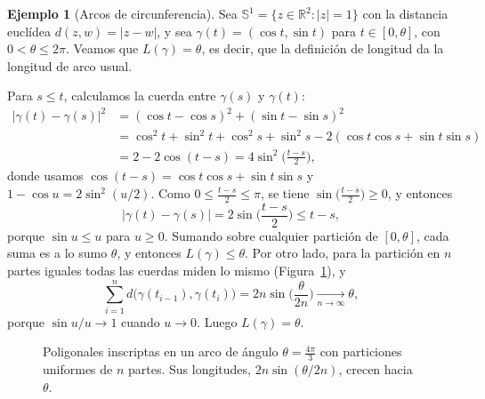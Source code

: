 \documentclass[12pt, a4paper]{amsart}
\theoremstyle{definition}
\newtheorem{ejemplo}[teorema]{Ejemplo}
\theoremstyle{remark}
\begin{document}
\begin{ejemplo}[Arcos de circunferencia]\label{ej:arco}
Sea $\mathbb S^1=\{z\in\mathbb R^2:|z|=1\}$ con la distancia euclídea $d(z,w)=|z-w|$, y sea $\gamma(t)=(\cos t,\sin t)$ para $t\in[0,\theta]$, con $0<\theta\le2\pi$. Veamos que $L(\gamma)=\theta$, es decir, que la definición de longitud da la longitud de arco usual.

Para $s\le t$, calculamos la cuerda entre $\gamma(s)$ y $\gamma(t)$:
\begin{align*}
|\gamma(t)-\gamma(s)|^2
&=(\cos t-\cos s)^2+(\sin t-\sin s)^2\\
&=\cos^2t+\sin^2t+\cos^2s+\sin^2s-2(\cos t\cos s+\sin t\sin s)\\
&=2-2\cos(t-s)=4\sin^2\Big(\frac{t-s}{2}\Big),
\end{align*}
donde usamos $\cos(t-s)=\cos t\cos s+\sin t\sin s$ y $1-\cos u=2\sin^2(u/2)$. Como $0\le\frac{t-s}{2}\le\pi$, se tiene $\sin\big(\frac{t-s}{2}\big)\ge0$, y entonces
\[
|\gamma(t)-\gamma(s)|=2\sin\Big(\frac{t-s}{2}\Big)\le t-s,
\]
porque $\sin u\le u$ para $u\ge0$. Sumando sobre cualquier partición de $[0,\theta]$, cada suma es a lo sumo $\theta$, y entonces $L(\gamma)\le\theta$. Por otro lado, para la partición en $n$ partes iguales todas las cuerdas miden lo mismo (Figura~\ref{fig:arco}), y
\[
\sum_{i=1}^n d\big(\gamma(t_{i-1}),\gamma(t_i)\big)=2n\sin\Big(\frac{\theta}{2n}\Big)\xrightarrow[n\to\infty]{}\theta,
\]
porque $\sin u/u\to1$ cuando $u\to0$. Luego $L(\gamma)=\theta$.
\end{ejemplo}

\begin{figure}[htbp]
\centering
{}
\caption{Poligonales inscriptas en un arco de ángulo $\theta=\frac{4\pi}{3}$ con particiones uniformes de $n$ partes. Sus longitudes, $2n\sin(\theta/2n)$, crecen hacia $\theta$.}
\label{fig:arco}
\end{figure}
\end{document}
